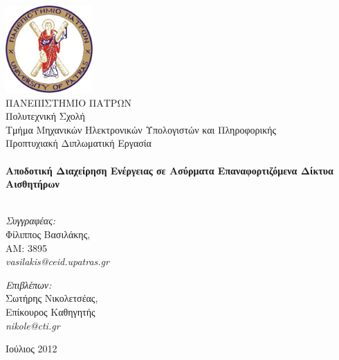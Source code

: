 
\begin{titlingpage}
\begin{center}

\includegraphics[width=0.25\textwidth]{images/upatras_logo.jpg}\\[1cm]

\HUGE 	ΠΑΝΕΠΙΣΤΗΜΙΟ ΠΑΤΡΩΝ\\
\LARGE	Πολυτεχνική Σχολή\\
\Huge	Τμήμα Μηχανικών Ηλεκτρονικών Υπολογιστών και Πληροφορικής\\[1.5cm]

\LARGE Προπτυχιακή Διπλωματική Εργασία\\[0.1cm]


\HRule \\[0.4cm]
{ \HUGE \bfseries Αποδοτική Διαχείρηση Ενέργειας σε Ασύρματα Επαναφορτιζόμενα Δίκτυα Αισθητήρων}\\[0.4cm]

\HRule \\[0.5cm]

\begin{minipage}{0.4\textwidth}
\begin{flushleft} \large
\textit{Συγγραφέας:}\\
Φίλιππος Βασιλάκης, \\AM: 3895\\ \textit{vasilakis@ceid.upatras.gr}
\end{flushleft}
\end{minipage}
\begin{minipage}{0.4\textwidth}
\begin{flushright} \large
\textit{Επιβλέπων:} \\
Σωτήρης Νικολετσέας, \\Επίκουρος Καθηγητής\\ \textit{nikole@cti.gr}
\end{flushright}
\end{minipage}

\vfill

{\large Ιούλιος 2012}

\end{center}

\end{titlingpage}
